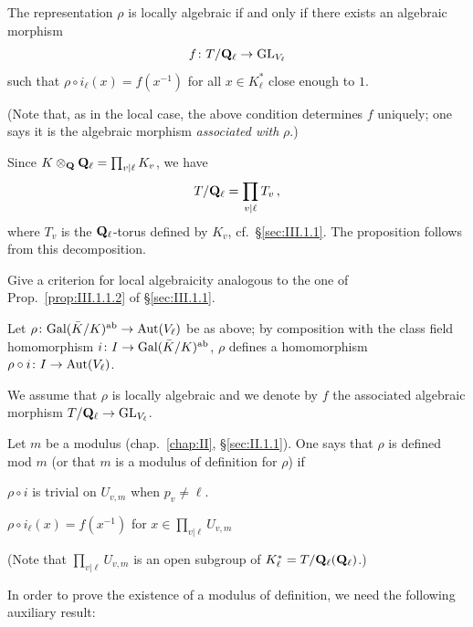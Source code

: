 \begin{proposition}
The representation $\rho$ is locally algebraic if and only if there
exists an algebraic morphism
\[
f\colon T/\mathbf{Q}_\ell \to \mathrm{GL}_{V_\ell}
\]
such that $\rho\circ i_\ell(x) = f(x^{-1})$ for all $x\in K_\ell^*$
close enough to $1$.
\end{proposition}

(Note that, as in the local case, the above condition determines $f$
uniquely; one says it is the algebraic morphism \emph{associated with}
$\rho$.)

Since $K\mathbin{\otimes}_{\mathbf{Q}} \mathbf{Q}_\ell = \prod_{v|\ell} K_v$, we have
\[
T/\mathbf{Q}_\ell = \prod_{v|\ell} T_v\,,
\]
where $T_v$ is the $\mathbf{Q}_\ell$-torus defined by $K_v$,
cf.~\S\ref{sec:III.1.1}.  The proposition follows from this decomposition.


Give a criterion for local algebraicity analogous to the one of
Prop.~\ref{prop:III.1.1.2} of \S\ref{sec:III.1.1}.


Let $\rho\colon \mathrm{Gal}(\bar K/K)^{\mathrm{ab}}\to\mathrm{Aut}(V_\ell)$ be as above;
by composition with the class field homomorphism
$i\colon I\to\mathrm{Gal}(\bar K/K)^{\mathrm{ab}}$, $\rho$ defines a homomorphism
$\rho\circ i\colon I\to\mathrm{Aut}(V_\ell)$.

We assume that $\rho$ is locally algebraic and we denote by $f$ the
associated algebraic morphism $T/\mathbf{Q}_\ell\to\mathrm{GL}_{V_\ell}$.

\begin{dfn}
Let $m$ be a modulus (chap.~\ref{chap:II}, \S\ref{sec:II.1.1}).  One says
that $\rho$ is defined mod $m$ (or that $m$ is a modulus of definition
for $\rho$) if
\begin{rlist}
\item $\rho\circ i$ is trivial on $U_{v,m}$ when $p_v\neq\ell$.
\item $\rho\circ i_\ell(x) = f(x^{-1})$ for
$x\in\prod_{v|\ell}U_{v,m}$
\end{rlist}
(Note that $\prod_{v|\ell}U_{v,m}$ is an open subgroup of
$K_\ell^* = T/\mathbf{Q}_\ell(\mathbf{Q}_\ell)$.)
\end{dfn}

In order to prove the existence of a modulus of definition, we need the
following auxiliary result:

